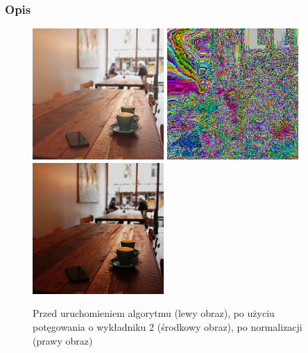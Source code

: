 \documentclass[a4paper,12pt]{book}
\begin{document}
\subsubsection*{Opis}
\begin{figure}[H]
	\caption{Przed uruchomieniem algorytmu (lewy obraz), po użyciu potęgowania o wykładniku 2 (środkowy obraz), po normalizacji (prawy obraz)}
	\includegraphics[width=5cm, height=5cm]{coffee-unmodified.jpg}
	\includegraphics[width=5cm, height=5cm]{3-4/power-color-coffee-2.png}
	\includegraphics[width=5cm, height=5cm]{3-4/power-color-coffee-2-norm.png}
\end{figure}
\end{document}

